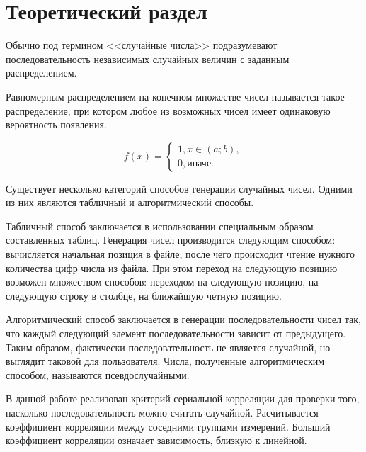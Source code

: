 \chapter{Теоретический раздел}

Обычно под термином <<случайные числа>> подразумевают последовательность независимых случайных величин с заданным распределением.

Равномерным распределением на конечном множестве чисел называется такое распределение, при котором любое из возможных чисел имеет одинаковую вероятность появления.

\begin{equation}
	f(x) = \begin{cases}
        1, x \in (a; b), \\
        0, \text{иначе}.
    \end{cases}
\end{equation}

Существует несколько категорий способов генерации случайных чисел. Одними из них являются табличный и алгоритмический способы.

Табличный способ заключается в использовании специальным образом составленных таблиц. Генерация чисел производится следующим способом: вычисляется начальная позиция в файле, после чего происходит чтение нужного количества цифр числа из файла. При этом переход на следующую позицию возможен множеством способов: переходом на следующую позицию, на следующую строку в столбце, на ближайшую четную позицию.

Алгоритмический способ заключается в генерации последовательности чисел так, что каждый следующий элемент последовательности зависит от предыдущего. Таким образом, фактически последовательность не является случайной, но выглядит таковой для пользователя. Числа, полученные алгоритмическим способом, называются псевдослучайными.

В данной работе реализован критерий сериальной корреляции для проверки того, насколько последовательность можно считать случайной. Расчитывается коэффициент корреляции между соседними группами измерений. Больший коэффициент корреляции означает зависимость, близкую к линейной.